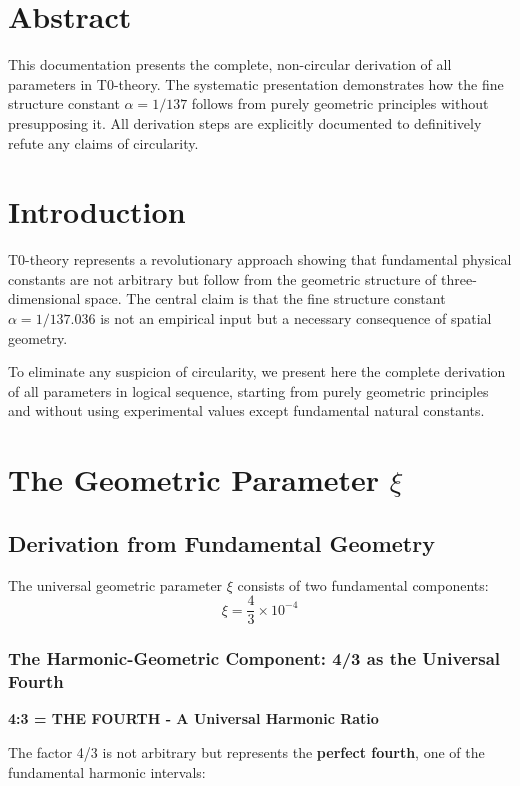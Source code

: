 \hfuzz=10pt
\section*{Abstract}
		This documentation presents the complete, non-circular derivation of all parameters in T0-theory. The systematic presentation demonstrates how the fine structure constant $\alpha = 1/137$ follows from purely geometric principles without presupposing it. All derivation steps are explicitly documented to definitively refute any claims of circularity.


	\section{Introduction}
	
	T0-theory represents a revolutionary approach showing that fundamental physical constants are not arbitrary but follow from the geometric structure of three-dimensional space. The central claim is that the fine structure constant $\alpha = 1/137.036$ is not an empirical input but a necessary consequence of spatial geometry.
	
	To eliminate any suspicion of circularity, we present here the complete derivation of all parameters in logical sequence, starting from purely geometric principles and without using experimental values except fundamental natural constants.
	
\section{The Geometric Parameter $\xi$}

\subsection{Derivation from Fundamental Geometry}

The universal geometric parameter $\xi$ consists of two fundamental components:
\begin{equation}
	\xi = \frac{4}{3} \times 10^{-4}
\end{equation}

\subsubsection{The Harmonic-Geometric Component: 4/3 as the Universal Fourth}

\textbf{4:3 = THE FOURTH - A Universal Harmonic Ratio}

The factor 4/3 is not arbitrary but represents the \textbf{perfect fourth}, one of the fundamental harmonic intervals:

